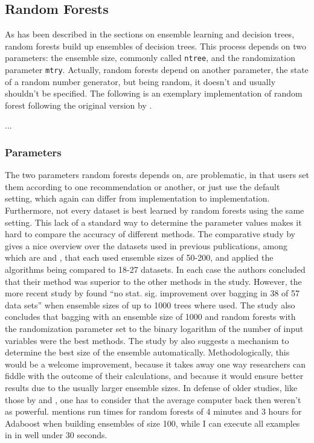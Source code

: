 \documentclass[a4paper,man,12pt,apacite]{apa6} %
\begin{document}
\subsection{Random Forests}
As has been described in the sections on ensemble learning and decision trees,
random forests build up ensembles of decision trees.
This process depends on two parameters: the ensemble size, commonly called
\texttt{ntree}, and the randomization parameter \texttt{mtry}.
Actually, random forests depend on another parameter,
the state of a random number generator, but being random,
it doesn't and usually shouldn't be specified.
The following is an exemplary implementation of random forest following the
original version by \cite{breiman2001random}.

...

\subsubsection{Parameters}
The two parameters random forests depends on, are problematic,
in that users set them according to one recommendation or another,
or just use the default setting, which again can differ from implementation
to implementation.
Furthermore, not every dataset is best learned by random forests using the
same setting.
This lack of a standard way to determine the parameter values makes it hard
to compare the accuracy of different methods.
The comparative study by \cite{banfield2007comparison} gives a nice overview
over the datasets used in previous publications,
among which are \cite{breiman2001random} and \cite{dietterich2000ensemble},
that each used ensemble sizes of 50-200, and applied the algorithms being
compared to 18-27 datasets.
In each case the authors concluded that their method was superior to the
other methods in the study.
However, the more recent study by \cite{banfield2007comparison} found
“no stat. sig. improvement over bagging in 38 of 57 data sets”
when ensemble sizes of up to 1000 trees where used.
The study also concludes that bagging with an ensemble size of 1000 and
random forests with the randomization parameter set to the
binary logarithm of the number of input variables were the best methods.
The study by \cite{banfield2007comparison} also suggests a mechanism
to determine the best size of the ensemble automatically.
Methodologically, this would be a welcome improvement, because it takes
away one way researchers can fiddle with the outcome of their calculations,
and because it would ensure better results due to the usually larger
ensemble sizes.
In defense of older studies, like those by \cite{breiman2001random} and
\cite{dietterich2000ensemble}, one has to consider that the average
computer back then weren't as powerful.
\cite{breiman2001random} mentions run times for random forests of 4 minutes
and 3 hours for Adaboost when building ensembles of size 100,
while I can execute all examples in \cite{strobl2009introduction}
in well under 30 seconds.
\end{document}
